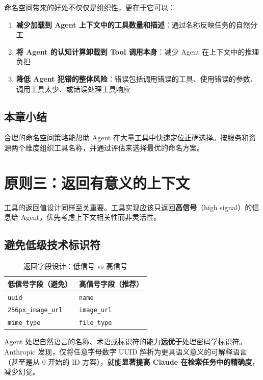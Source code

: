 \documentclass[a4paper]{article}
\begin{document}
命名空间带来的好处不仅仅是组织性，更在于它可以：

\begin{enumerate}[leftmargin=1.5em]
    \item \textbf{减少加载到 Agent 上下文中的工具数量和描述}：通过名称反映任务的自然分工
    \item \textbf{将 Agent 的认知计算卸载到 Tool 调用本身}：减少 Agent 在上下文中的推理负担
    \item \textbf{降低 Agent 犯错的整体风险}：错误包括调用错误的工具、使用错误的参数、调用工具太少、或错误处理工具响应
\end{enumerate}

\subsection{本章小结}

合理的命名空间策略能帮助 Agent 在大量工具中快速定位正确选择。按服务和资源两个维度组织工具名称，并通过评估来选择最优的命名方案。


\section{原则三：返回有意义的上下文}

工具的返回值设计同样至关重要。工具实现应该只返回\textbf{高信号}（high signal）的信息给 Agent，优先考虑上下文相关性而非灵活性。

\subsection{避免低级技术标识符}

\begin{table}[H]
\centering
\caption{返回字段设计：低信号 vs 高信号}
\begin{tabular}{p{}p{}}
\toprule
\textbf{低信号字段（避免）} & \textbf{高信号字段（推荐）} \\
\midrule
\texttt{uuid} & \texttt{name} \\
\texttt{256px\_image\_url} & \texttt{image\_url} \\
\texttt{mime\_type} & \texttt{file\_type} \\
\bottomrule
\end{tabular}
\end{table}

Agent 处理自然语言的名称、术语或标识符的能力\textbf{远优于}处理密码学标识符。Anthropic 发现，仅将任意字母数字 UUID 解析为更具语义意义的可解释语言（甚至是从 0 开始的 ID 方案），就能\textbf{显著提高 Claude 在检索任务中的精确度}，减少幻觉。
\end{document}
